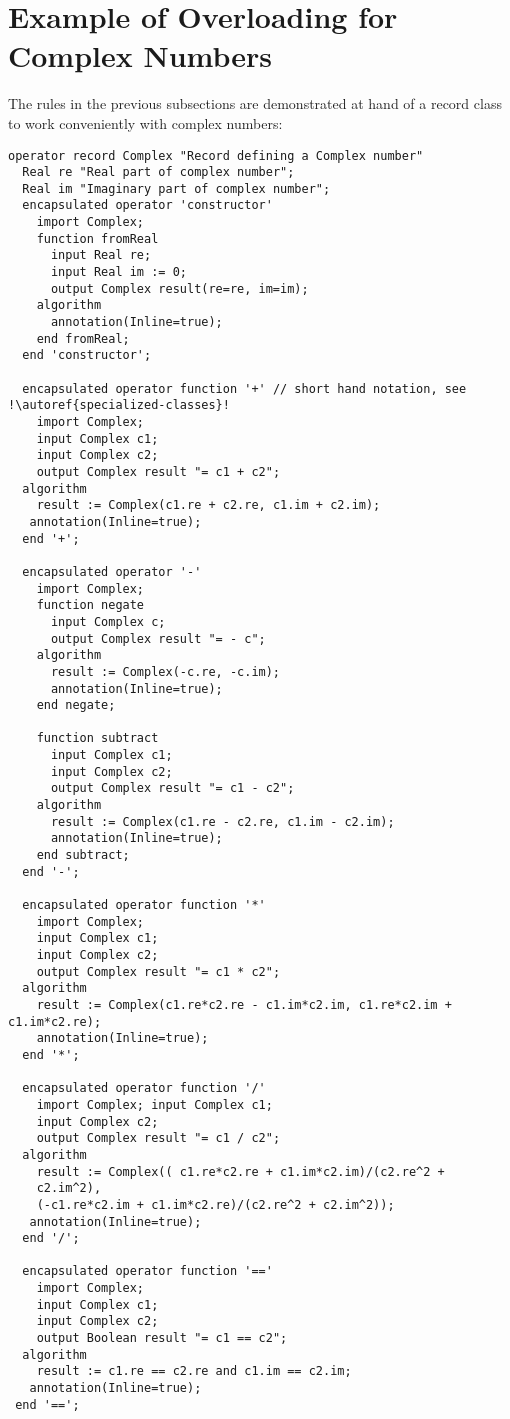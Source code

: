 \section{Example of Overloading for Complex Numbers}

\begin{example}
The rules in the previous subsections are demonstrated at hand
of a record class to work conveniently with complex numbers:
\begin{lstlisting}[language=modelica,escapechar=!]
operator record Complex "Record defining a Complex number"
  Real re "Real part of complex number";
  Real im "Imaginary part of complex number";
  encapsulated operator 'constructor'
    import Complex;
    function fromReal
      input Real re;
      input Real im := 0;
      output Complex result(re=re, im=im);
    algorithm
      annotation(Inline=true);
    end fromReal;
  end 'constructor';

  encapsulated operator function '+' // short hand notation, see !\autoref{specialized-classes}!
    import Complex;
    input Complex c1;
    input Complex c2;
    output Complex result "= c1 + c2";
  algorithm
    result := Complex(c1.re + c2.re, c1.im + c2.im);
   annotation(Inline=true);
  end '+';

  encapsulated operator '-'
    import Complex;
    function negate
      input Complex c;
      output Complex result "= - c";
    algorithm
      result := Complex(-c.re, -c.im);
      annotation(Inline=true);
    end negate;

    function subtract
      input Complex c1;
      input Complex c2;
      output Complex result "= c1 - c2";
    algorithm
      result := Complex(c1.re - c2.re, c1.im - c2.im);
      annotation(Inline=true);
    end subtract;
  end '-';

  encapsulated operator function '*'
    import Complex;
    input Complex c1;
    input Complex c2;
    output Complex result "= c1 * c2";
  algorithm
    result := Complex(c1.re*c2.re - c1.im*c2.im, c1.re*c2.im + c1.im*c2.re);
    annotation(Inline=true);
  end '*';

  encapsulated operator function '/'
    import Complex; input Complex c1;
    input Complex c2;
    output Complex result "= c1 / c2";
  algorithm
    result := Complex(( c1.re*c2.re + c1.im*c2.im)/(c2.re^2 +
    c2.im^2),
    (-c1.re*c2.im + c1.im*c2.re)/(c2.re^2 + c2.im^2));
   annotation(Inline=true);
  end '/';

  encapsulated operator function '=='
    import Complex;
    input Complex c1;
    input Complex c2;
    output Boolean result "= c1 == c2";
  algorithm
    result := c1.re == c2.re and c1.im == c2.im;
   annotation(Inline=true);
 end '==';


\end{lstlisting}
\end{example}
